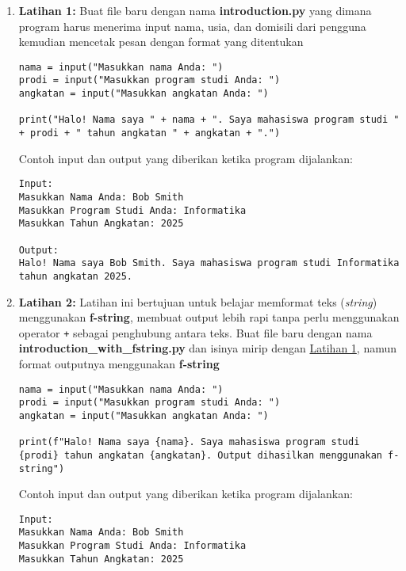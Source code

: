 \begin{enumerate}
\item \label{sec:first-exercise} \textbf{Latihan 1:} Buat file baru dengan nama \textbf{introduction.py} yang dimana program harus menerima input nama, usia, dan domisili dari pengguna kemudian mencetak pesan dengan format yang ditentukan
\begin{lstlisting}[style=PythonStyle, caption={Latihan 1}]
nama = input("Masukkan nama Anda: ")
prodi = input("Masukkan program studi Anda: ")
angkatan = input("Masukkan angkatan Anda: ")

print("Halo! Nama saya " + nama + ". Saya mahasiswa program studi " + prodi + " tahun angkatan " + angkatan + ".")
\end{lstlisting}

Contoh input dan output yang diberikan ketika program dijalankan:

\begin{verbatim}
Input:
Masukkan Nama Anda: Bob Smith
Masukkan Program Studi Anda: Informatika
Masukkan Tahun Angkatan: 2025

Output:
Halo! Nama saya Bob Smith. Saya mahasiswa program studi Informatika tahun angkatan 2025.
\end{verbatim}

\item \textbf{Latihan 2:} Latihan ini bertujuan untuk belajar memformat teks (\textit{string}) menggunakan \textbf{f-string}, membuat output lebih rapi tanpa perlu menggunakan operator \texttt{+} sebagai penghubung antara teks. Buat file baru dengan nama \textbf{introduction_with_fstring.py} dan isinya mirip dengan \hyperref[sec:first-exercise]{Latihan 1}, namun format outputnya menggunakan \textbf{f-string}

\begin{lstlisting}[style=PythonStyle, caption={Latihan 2}]
nama = input("Masukkan nama Anda: ")
prodi = input("Masukkan program studi Anda: ")
angkatan = input("Masukkan angkatan Anda: ")

print(f"Halo! Nama saya {nama}. Saya mahasiswa program studi {prodi} tahun angkatan {angkatan}. Output dihasilkan menggunakan f-string")
\end{lstlisting}

Contoh input dan output yang diberikan ketika program dijalankan:

\begin{verbatim}
Input:
Masukkan Nama Anda: Bob Smith
Masukkan Program Studi Anda: Informatika
Masukkan Tahun Angkatan: 2025


\end{verbatim}
\end{enumerate}
